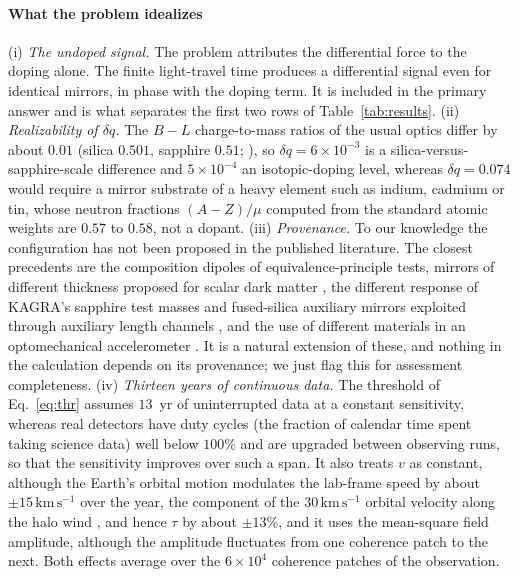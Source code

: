 \paragraph*{What the problem idealizes}
(i) \emph{The undoped signal.} The problem attributes the differential force to the doping alone. The finite light-travel time produces a differential signal even for identical mirrors, in phase with the doping term. It is included in the primary answer and is what separates the first two rows of Table~\ref{tab:results}. (ii) \emph{Realizability of $\delta q$.} The $B-L$ charge-to-mass ratios of the usual optics differ by about $0.01$ (silica $0.501$, sapphire $0.51$; \citealt{Michimura2020}), so $\delta q=6\times10^{-3}$ is a silica-versus-sapphire-scale difference and $5\times10^{-4}$ an isotopic-doping level, whereas $\delta q=0.074$ would require a mirror substrate of a heavy element such as indium, cadmium or tin, whose neutron fractions $(A-Z)/\mu$ computed from the standard atomic weights \citep{Prohaska2022} are $0.57$ to $0.58$, not a dopant. (iii) \emph{Provenance.} To our knowledge the configuration has not been proposed in the published literature. The closest precedents are the composition dipoles of equivalence-principle tests, mirrors of different thickness proposed for scalar dark matter \citep{GroteStadnik2019}, the different response of KAGRA's sapphire test masses and fused-silica auxiliary mirrors exploited through auxiliary length channels \citep{Michimura2020}, and the use of different materials in an optomechanical accelerometer \citep{Manley2021}. It is a natural extension of these, and nothing in the calculation depends on its provenance; we just flag this for assessment completeness. (iv) \emph{Thirteen years of continuous data.} The threshold of Eq.~\eqref{eq:thr} assumes $13$~yr of uninterrupted data at a constant sensitivity, whereas real detectors have duty cycles (the fraction of calendar time spent taking science data) well below $100\%$ and are upgraded between observing runs, so that the sensitivity improves over such a span. It also treats $v$ as constant, although the Earth's orbital motion modulates the lab-frame speed by about $\pm15\,\mathrm{km\,s^{-1}}$ over the year, the component of the $30\,\mathrm{km\,s^{-1}}$ orbital velocity along the halo wind \citep[Eq.~3.6]{LewinSmith1996}, and hence $\tau$ by about $\pm13\%$, and it uses the mean-square field amplitude, although the amplitude fluctuates from one coherence patch to the next. Both effects average over the $6\times10^{4}$ coherence patches of the observation.

